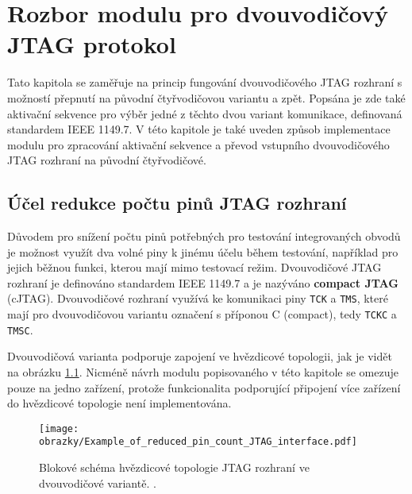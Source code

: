 \chapter{Rozbor modulu pro dvouvodičový \acs{JTAG} protokol}
Tato kapitola se zaměřuje na princip fungování dvouvodičového \acs{JTAG} rozhraní s možností přepnutí na původní čtyřvodičovou variantu a zpět. Popsána je zde také aktivační sekvence pro výběr jedné z těchto dvou variant komunikace, definovaná standardem IEEE 1149.7. V této kapitole je také uveden způsob implementace modulu pro zpracování aktivační sekvence a převod vstupního dvouvodičového \acs{JTAG} rozhraní na původní čtyřvodičové. %
	
\section{Účel redukce počtu pinů \acs{JTAG} rozhraní}	\label{sec:2w_interface}
Důvodem pro snížení počtu pinů potřebných pro testování integrovaných obvodů je možnost využít dva volné piny k jinému účelu během testování, například pro jejich běžnou funkci, kterou mají mimo testovací režim. Dvouvodičové \acs{JTAG} rozhraní je definováno standardem IEEE 1149.7 a je nazýváno \textbf{compact \acs{JTAG}} (c\acs{JTAG}). Dvouvodičové rozhraní využívá ke komunikaci piny \texttt{\acs{TCK}} a \texttt{\acs{TMS}}, které mají pro dvouvodičovou variantu označení s příponou C (compact), tedy \texttt{\acs{TCKC}} a \texttt{\acs{TMSC}}. \cite{IEEE_1149-7} \cite{JTAG}

Dvouvodičová varianta podporuje zapojení ve hvězdicové topologii, jak je vidět na obrázku \ref{fig:star2_sch}. Nicméně návrh modulu popisovaného v této kapitole se omezuje pouze na jedno zařízení, protože funkcionalita podporující připojení více zařízení do hvězdicové topologie není implementována.

\begin{figure}[!h]
  \begin{center}
    \texttt{[image: obrazky/Example\_of\_reduced\_pin\_count\_JTAG\_interface.pdf]}
  \end{center}
  \caption{Blokové schéma hvězdicové topologie \acs{JTAG} rozhraní ve dvouvodičové variantě. \cite{JTAG}.}
	\label{fig:star2_sch}
\end{figure}

